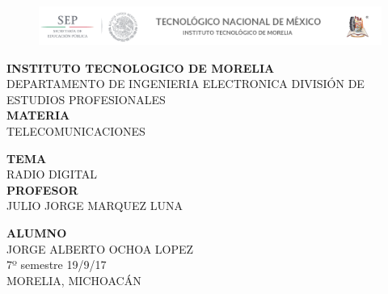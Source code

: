 \documentclass[letterpaper,10pt]{article}
\begin{document}
	
\begin{titlepage}
	\begin{figure}[h!]
		\begin{center}
			\vspace{1.5cm}
			\includegraphics[scale= .5, ]{encabezado.png}
			\label{escudouam1}
			\vspace{-1cm}
		\end{center}
	\end{figure}
	\begin{center}
		\vspace{1cm} 
		\LARGE{\textbf{INSTITUTO TECNOLOGICO DE MORELIA}} \\
		\vspace{1cm}
		DEPARTAMENTO DE INGENIERIA ELECTRONICA
		DIVISIÓN DE ESTUDIOS PROFESIONALES \\  
		\vspace{2.3cm} {\large \textbf{MATERIA}\\ \LARGE TELECOMUNICACIONES}
		
		
		\vspace{1.5cm} {\large \textbf{TEMA}\\ \LARGE RADIO DIGITAL}\\ 
		
		\vspace{1.5cm} {\large \textbf{PROFESOR}\\ \LARGE JULIO JORGE MARQUEZ LUNA}
		
		\vspace{1.5cm} {\large \textbf{ALUMNO}\\ \large JORGE ALBERTO OCHOA LOPEZ} \\
		\normalsize{7º semestre
			\hfill {19/9/17}}\\ 
		MORELIA, MICHOACÁN
	\end{center}
\end{titlepage}
\pagebreak
\justify
\tableofcontents
\pagebreak
{}
	
\end{document}
